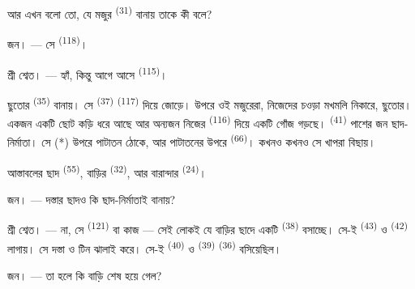 আর এখন বলো তো, যে মজুর  \textsuperscript{(31)} বানায় তাকে কী বলে?

\textsc{জন}। --- সে  \textsuperscript{(118)}।

\VUsaut{3.0mm}
\VUsaut{3.0mm}

\textsc{শ্রী শ্বেত}। --- হ্যাঁ, কিন্তু আগে আসে 
\textsuperscript{(115)}।

ছুতোর  \textsuperscript{(35)} বানায়। সে 
\textsuperscript{(37)}  \textsuperscript{(117)} দিয়ে জোড়ে। উপরে ওই
মজুরেরা, নিজেদের চওড়া মখমলি নিকারে, ছুতোর। একজন একটি ছোট কড়ি ধরে আছে আর
অন্যজন নিজের  \textsuperscript{(116)} দিয়ে একটি গোঁজ গড়ছে।
 \textsuperscript{(41)} পাশের জন ছাদ-নির্মাতা। সে
 (*) উপরে পাটাতন ঠোকে, আর পাটাতনের উপরে 
\textsuperscript{(66)}। কখনও কখনও সে খাপরা বিছায়।


আস্তাবলের ছাদ  \textsuperscript{(55)}, বাড়ির
 \textsuperscript{(32)}, আর বারান্দার 
\textsuperscript{(24)}।

\textsc{জন}। --- দস্তার ছাদও কি ছাদ-নির্মাতাই বানায়?

\textsc{শ্রী শ্বেত}। --- না, সে  \textsuperscript{(121)} বা
 কাজ --- সেই লোকই যে বাড়ির ছাদে একটি
 \textsuperscript{(38)} বসাচ্ছে। সে-ই
 \textsuperscript{(43)} ও 
\textsuperscript{(42)} লাগায়। সে দস্তা ও টিন ঝালাই করে। সে-ই
 \textsuperscript{(40)} ও 
\textsuperscript{(39)}  \textsuperscript{(36)} বসিয়েছিল।

\textsc{জন}। --- তা হলে কি বাড়ি শেষ হয়ে গেল?

\VUsaut{3.0mm}
\VUsaut{3.0mm}

